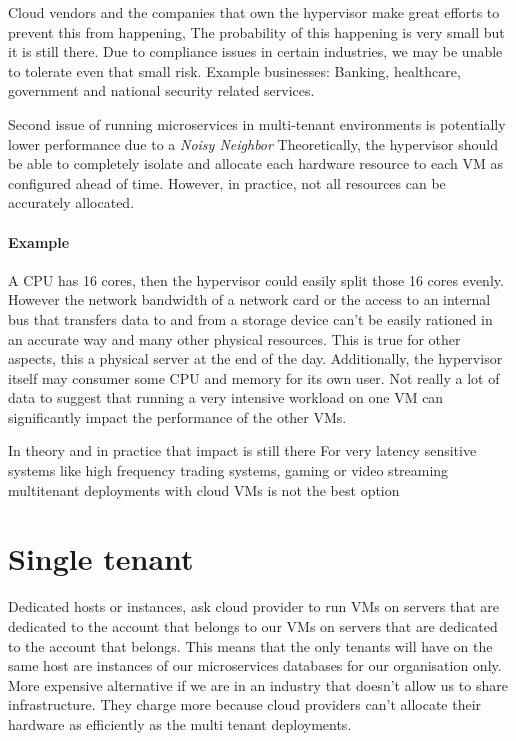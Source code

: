 \documentclass[a4paper, 11pt]{book}
\begin{document}
    Cloud vendors and the companies that own the hypervisor make great efforts to prevent this from happening,
    The probability of this happening is very small but it is still there.
    Due to compliance issues in certain industries, we may be unable to tolerate even that small risk.
    Example businesses: Banking, healthcare, government and national security related services.

    Second issue of running microservices in multi-tenant environments is potentially lower performance due to a \textit{Noisy Neighbor}
    Theoretically, the hypervisor should be able to completely isolate and allocate each hardware resource to each VM as configured ahead of time.
    However, in practice, not all resources can be accurately allocated.

    \paragraph{Example}
    A CPU has 16 cores, then the hypervisor could easily split those 16 cores evenly.
    However the network bandwidth of a network card or the access to an internal bus that transfers data to and from a storage device can't be easily rationed in an accurate way and many other physical resources.
    This is true for other aspects, this a physical server at the end of the day.
    Additionally, the hypervisor itself may consumer some CPU and memory for its own user.
    Not really a lot of data to suggest that running a very intensive workload on one VM can significantly impact the performance of the other VMs.

    In theory and in practice that impact is still there
    For very latency sensitive systems like high frequency trading systems, gaming or video streaming multitenant deployments with cloud VMs is not the best option


    \section{Single tenant}
    Dedicated hosts or instances, ask cloud provider to run VMs on servers that are dedicated to the account that belongs to our VMs on servers that are dedicated to the account that belongs.
    This means that the only tenants will have on the same host are instances of our microservices databases for our organisation only.
    More expensive alternative if we are in an industry that doesn't allow us to share infrastructure.
    They charge more because cloud providers can't allocate their hardware as efficiently as the multi tenant deployments.
\end{document}
